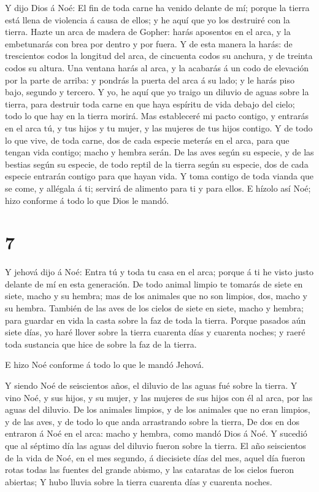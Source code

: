  Y dijo Dios á Noé: El fin de toda carne ha venido delante
de mí; porque la tierra está llena de violencia á causa de ellos; y he
aquí que yo los destruiré con la tierra.  Hazte un arca de
madera de Gopher: harás aposentos en el arca, y la embetunarás con brea
por dentro y por fuera.  Y de esta manera la harás: de
trescientos codos la longitud del arca, de cincuenta codos su anchura, y
de treinta codos su altura.  Una ventana harás al arca, y
la acabarás á un codo de elevación por la parte de arriba: y pondrás la
puerta del arca á su lado; y le harás piso bajo, segundo y tercero.
 Y yo, he aquí que yo traigo un diluvio de aguas sobre la
tierra, para destruir toda carne en que haya espíritu de vida debajo del
cielo; todo lo que hay en la tierra morirá.  Mas
estableceré mi pacto contigo, y entrarás en el arca tú, y tus hijos y tu
mujer, y las mujeres de tus hijos contigo.  Y de todo lo
que vive, de toda carne, dos de cada especie meterás en el arca, para
que tengan vida contigo; macho y hembra serán.  De las aves
según su especie, y de las bestias según su especie, de todo reptil de
la tierra según su especie, dos de cada especie entrarán contigo para
que hayan vida.  Y toma contigo de toda vianda que se come,
y allégala á ti; servirá de alimento para ti y para ellos. 
E hízolo así Noé; hizo conforme á todo lo que Dios le mandó.

\hypertarget{section-6}{%
\section{7}\label{section-6}}

 Y jehová dijo á Noé: Entra tú y toda tu casa en el arca;
porque á ti he visto justo delante de mí en esta generación.
 De todo animal limpio te tomarás de siete en siete, macho y
su hembra; mas de los animales que no son limpios, dos, macho y su
hembra.  También de las aves de los cielos de siete en
siete, macho y hembra; para guardar en vida la casta sobre la faz de
toda la tierra.  Porque pasados aún siete días, yo haré
llover sobre la tierra cuarenta días y cuarenta noches; y raeré toda
sustancia que hice de sobre la faz de la tierra.

 E hizo Noé conforme á todo lo que le mandó Jehová.

 Y siendo Noé de seiscientos años, el diluvio de las aguas
fué sobre la tierra.  Y vino Noé, y sus hijos, y su mujer, y
las mujeres de sus hijos con él al arca, por las aguas del diluvio.
 De los animales limpios, y de los animales que no eran
limpios, y de las aves, y de todo lo que anda arrastrando sobre la
tierra,  De dos en dos entraron á Noé en el arca: macho y
hembra, como mandó Dios á Noé.  Y sucedió que al séptimo
día las aguas del diluvio fueron sobre la tierra.  El año
seiscientos de la vida de Noé, en el mes segundo, á diecisiete días del
mes, aquel día fueron rotas todas las fuentes del grande abismo, y las
cataratas de los cielos fueron abiertas;  Y hubo lluvia
sobre la tierra cuarenta días y cuarenta noches.

